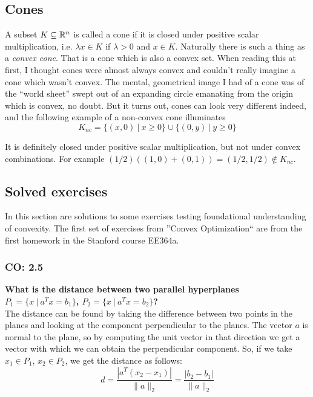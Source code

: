 \subsection{Cones}

A subset $K \subseteq \mathbb{R}^n$ is called a cone if it is closed under positive scalar multiplication, i.e. $\lambda x \in K$ if $\lambda > 0$ and $x \in K$.
Naturally there is such a thing as a \textit{convex cone}.
That is a cone which is also a convex set.
When reading this at first, I thought cones were almost always convex and couldn't really imagine a cone which wasn't convex.
The mental, geometrical image I had of a cone was of the ``world sheet'' swept out of an expanding circle emanating from the origin which is convex, no doubt.
But it turns out, cones can look very different indeed, and the following example of a non-convex cone illuminates
\[
    K_{nc} = \{(x, 0)\> |\> x \geq 0\} \cup \{(0, y)\> |\> y \geq 0\} 
\] 



It is definitely closed under positive scalar multiplication, but not under convex combinations. 
For example $(1/2)((1, 0) + (0, 1)) = (1/2, 1/2) \notin K_{nc}$.

\subsection{Solved exercises}

In this section are solutions to some exercises testing foundational understanding of convexity.
The first set of exercises from ''Convex Optimization`` are from the first homework in the Stanford course EE364a.

\subsubsection{CO: 2.5}
\textbf{What is the distance between two parallel hyperplanes $P_1 = \{x \> | \> a^T x = b_1\}$, $P_2 = \{x \> | \> a^T x = b_2\}$?}\\
The distance can be found by taking the difference between two points in the planes and looking at the component perpendicular to the planes.
The vector $a$ is normal to the plane, so by computing the unit vector in that direction we get a vector with which we can obtain the perpendicular component.
So, if we take $x_1 \in P_1$, $x_2 \in P_2$, we get the distance as follows:
\[
    d = \frac{|a^T(x_2 - x_1)|}{\|a\|_2} = \frac{|b_2 - b_1|}{\| a \|_2}
\]

